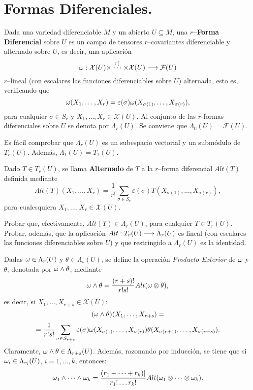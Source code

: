 \documentclass[cursovd_portada.tex]{subfiles}
\begin{document}
\section{Formas Diferenciales.}
\begin{defi}
Dada una variedad diferenciable $M$ y un abierto $U\subseteq M$, una {\bf $r$--Forma Diferencial} sobre $U$ es un
campo de tensores $r$--covariantes diferenciable y alternado sobre $U$, es decir, una aplicación
$$\omega:{\cal X}(U)\times\stackrel{r)}\cdots\times\mathcal{X}(U)\longrightarrow\mathcal{F}(U)$$
$r$--lineal (con escalares las funciones diferenciables sobre $U$) alternada, esto es, verificando que
$$\omega(X_1,\dots ,X_r)=\varepsilon(\sigma)\omega(X_{\sigma(1)},\dots ,X_{\sigma(r)}),$$
para cualquier $\sigma\in S_r$ y $X_1,\dots ,X_r\in\mathcal{X}(U)$. Al conjunto de las $r$-formas diferenciales
sobre $U$ se denota por $\Lambda_r(U)$. Se conviene que $\Lambda_0(U)=\mathcal{F}(U)$.
\end{defi}
\begin{nota}
{\rm Es fácil comprobar que $\Lambda_r(U)$ es un subespacio vectorial y un sub\-mó\-du\-lo de $T_r(U)$. Además,
$\Lambda_1(U)=T_1(U)$. }
\end{nota}
\begin{defi}
Dado $T\in T_r(U)$, se llama {\bf Alternado} de $T$ a la $r$--forma diferencial $Alt(T)$ definida mediante
$$Alt(T)(X_1,\dots ,X_r)=\frac{1}{r!}\sum_{\sigma\in S_r}\varepsilon(\sigma)T(X_{\sigma(1)},\dots
,X_{\sigma(r)}),$$ para cualesquiera $X_1,\dots ,X_r\in\mathcal{X}(U)$.
\end{defi}
\begin{ejer}
{\rm Probar que, efectivamente, $Alt(T)\in\Lambda_r(U)$, para cualquier $T\in T_r(U)$. Probar, además, que
la aplicación $Alt:T_r(U)\longrightarrow\Lambda_r(U)$ es lineal (con escalares las funciones diferenciables sobre $U$) y que
restringido a $\Lambda_r(U)$ es la identidad.}
\end{ejer}
Dadas $\omega\in\Lambda_r(U)$ y $\theta\in\Lambda_s(U)$, se define la operación {\it Producto Exterior} de $\omega$ y
$\theta$, denotada por $\omega\wedge\theta$, mediante
$$\omega\wedge\theta=\frac{(r+s)!}{r!s!}Alt(\omega\otimes\theta),$$
es decir, si $X_1,\dots ,X_{r+s}\in\mathcal{X}(U)$:
$$(\omega\wedge\theta)(X_1,\dots ,X_{r+s})=$$
$$=\frac{1}{r!s!}\sum_{\sigma\in S_{r+s}}\varepsilon(\sigma)\omega(X_{\sigma(1)},\dots
,X_{\sigma(r)})\theta(X_{\sigma(r+1)},\dots ,X_{\sigma(r+s)}).$$ \hs Claramente,
$\omega\wedge\theta\in\Lambda_{r+s}(U)$. Además, razonando por inducción, se tiene que si $\omega_i\in\Lambda_{r_i}(U)$,
$i=1,\dots ,k$, entonces:
$$\omega_1\wedge\cdots\wedge\omega_k=\frac{(r_1+\cdots +r_k)|}{r_1!\dots r_k!}Alt(\omega_1\otimes\cdots\otimes\omega_k).$$
\end{document}
